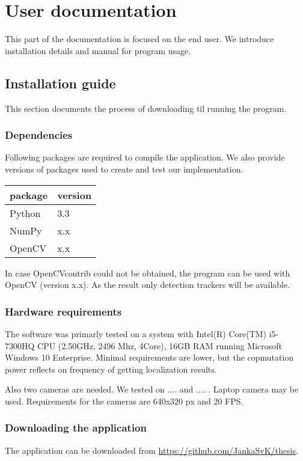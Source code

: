 \chapter{User documentation}
This part of the documentation is focused on the end user. We introduce
installation details and manual for program usage.

\section{Installation guide}
This section documents the process of downloading til running the program.

\subsection{Dependencies}
Following packages are required to compile the application. We also provide
versions of packages used to create and test our implementation.

\begin{center}
\begin{tabular}{l l}
	package	&	version \\ \hline
	Python	&	3.3 \\
	NumPy	&	x.x \\
	OpenCV	&	x.x 
\end{tabular}
\end{center}

In case OpenCVcontrib could not be obtained, the program can be used with
OpenCV (version x.x). As the result only detection trackers will be available.

\subsection{Hardware requirements}
The software was primarly tested on a system with Intel(R) Core(TM) i5-7300HQ
CPU (2.50GHz, 2496 Mhz, 4Core), 16GB RAM running Microsoft Windows 10
Enterprise. Minimal requirements are lower, but the copmutation power reflects
on frequency of getting localization results.

Also two cameras are needed. We tested on .... and .... . Laptop camera may be
used. Requirements for the cameras are 640x320 px and 20 FPS.

\subsection{Downloading the application}
The application can be downloaded from \url{https://github.com/JankaSvK/thesis}.

